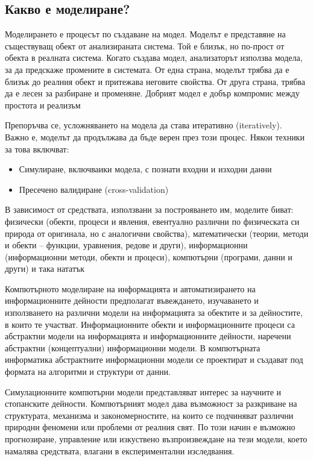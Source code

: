 	\subsection{Какво е моделиране?}
	
		Моделирането е процесът по създаване на модел. Моделът е представяне на съществуващ обект 
		от анализираната система. Той е близък, но по-прост от обекта в реалната система.
		Когато създава модел, анализаторът използва модела, за да предскаже промените в системата.
		От една страна, моделът трябва да е близък до реалния обект и притежава неговите свойства.
		От друга страна, трябва да е лесен за разбиране и променяне.
		Добрият модел е добър компромис между простота и реализъм \cite{Anu}
	
		Препоръчва се, усложняването на модела да става итеративно (iteratively). 
		Важно е, моделът да продължава да бъде верен през този процес. 		
		Някои техники за това включват:		
		
		\begin{itemize}		
			\item Симулиране, включваики модела, с познати входни и изходни данни			
			\item Пресечено валидиране (cross-validation) \cite{Mahoney}				
		\end{itemize}		 
		
		В зависимост от средствата, използвани за построяването им, моделите биват: физически
		(обекти, процеси и явления, евентуално различни по физическата си природа от оригинала,
		но с аналогични свойства), математически (теории, методи и обекти – функции, уравнения,
		редове и други), информационни (информационни методи, обекти и процеси), компютърни
		(програми, данни и други) и така нататък \cite{Totkov}
		
		Компютърното моделиране на информацията и автоматизирането на
		информационните дейности предполагат въвеждането, изучаването и използването на
		различни модели на информацията за обектите и за дейностите, в които те участват.
		Информационните обекти и информационните процеси са абстрактни модели на
		информацията и информационните дейности, наречени абстрактни (концептуални)
		информационни модели. В компютърната информатика абстрактните информационни
		модели се проектират и създават под формата на алгоритми и структури от данни. \cite{Totkov}
		
		Симулационните компютърни модели представляват интерес за научните и
		стопанските дейности. Компютърният модел дава възможност за разкриване на структурата,
		механизма и закономерностите, на които се подчиняват различни природни феномени или
		проблеми от реалния свят. По този начин е възможно прогнозиране, управление или
		изкуствено възпроизвеждане на тези модели, което намалява средствата, влагани в
		експериментални изследвания. \cite{Iliev}
		
